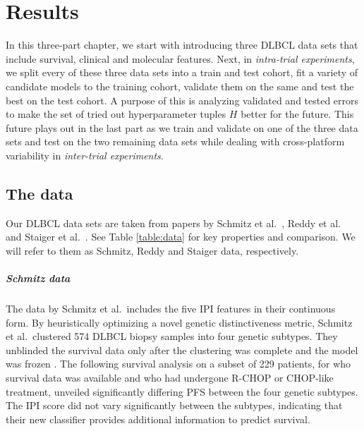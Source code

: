 \chapter{Results} \label{chap:results}

In this three-part chapter, we start with introducing three DLBCL data sets that include 
survival, clinical and molecular features. Next, in \textit{intra-trial experiments}, we split 
every of these three data sets into a train and test cohort, fit a variety of candidate models to 
the training cohort, validate them on the same and test the best on the test cohort. A purpose of 
this is analyzing validated and tested errors to make the set of tried out hyperparameter tuples 
$H$ better for the future. This future 
plays out in the last part as we train and validate on one of the three data sets and test on 
the two remaining data sets while dealing with cross-platform variability in 
\textit{inter-trial experiments}.

\section{The data}\label{sec:data}

Our DLBCL data sets are taken from papers by Schmitz et al.\ \cite{schmitz18}, Reddy et al.\ 
\cite{reddy17} and Staiger et al.\ \cite{staiger20}. See Table \ref{table:data} for key properties 
and comparison. We will refer to them as Schmitz, Reddy and Staiger data, respectively.



\paragraph{Schmitz data}
The data by Schmitz et al.\ includes the five IPI features in their continuous form. 
By heuristically optimizing a novel genetic distinctiveness metric, Schmitz et al.\ 
clustered \num{574} DLBCL biopsy samples into four genetic subtypes. They 
unblinded the survival data only after the clustering was complete and the 
model was frozen \cite[Appendix 1, pp. 16--18]{schmitz18}. The following survival analysis 
on a subset of \num{229} patients, for who survival data was available and who had undergone R-CHOP 
or CHOP-like treatment, unveiled significantly differing PFS between the four genetic subtypes. The 
IPI score did not vary significantly between the subtypes, 
indicating that their new classifier provides additional information to predict survival.

